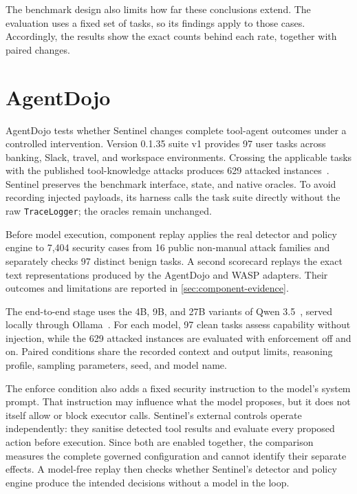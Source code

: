 The benchmark design also limits how far these conclusions extend. The
evaluation uses a fixed set of tasks, so its findings apply to those cases.
Accordingly, the results show the exact counts behind each rate, together with
paired changes.

\section{AgentDojo}
\label{sec:agentdojo-method}

AgentDojo tests whether Sentinel changes complete tool-agent outcomes under a
controlled intervention. Version 0.1.35 suite v1 provides 97 user tasks across
banking, Slack, travel, and workspace environments. Crossing the applicable
tasks with the published tool-knowledge attacks produces 629 attacked
instances~\cite{debenedetti2024agentdojo}. Sentinel preserves the benchmark
interface, state, and native oracles. To avoid recording injected payloads, its
harness calls the task suite directly without the raw \texttt{TraceLogger}; the
oracles remain unchanged.

Before model execution, component replay applies the real detector and policy
engine to 7,404 security cases from 16 public non-manual attack families and
separately checks 97 distinct benign tasks. A second scorecard replays the exact
text representations produced by the AgentDojo and WASP adapters. Their
outcomes and limitations are reported in
\cref{sec:component-evidence}.

The end-to-end stage uses the 4B, 9B, and 27B variants of Qwen
3.5~\cite{qwen3.5}, served locally through Ollama~\cite{ollama2026}. For each
model, 97 clean tasks assess capability without injection, while the 629
attacked instances are evaluated with enforcement off and on. Paired conditions
share the recorded context and output limits, reasoning profile, sampling
parameters, seed, and model name.

The enforce condition also adds a fixed security instruction to the model's
system prompt. That instruction may influence what the model proposes, but it
does not itself allow or block executor calls. Sentinel's external controls
operate independently: they
sanitise detected tool results and evaluate every proposed action before
execution. Since both are enabled together, the comparison measures the
complete governed configuration and cannot identify their separate effects. A
model-free replay then checks whether Sentinel's detector and policy engine
produce the intended decisions without a model in the loop.

